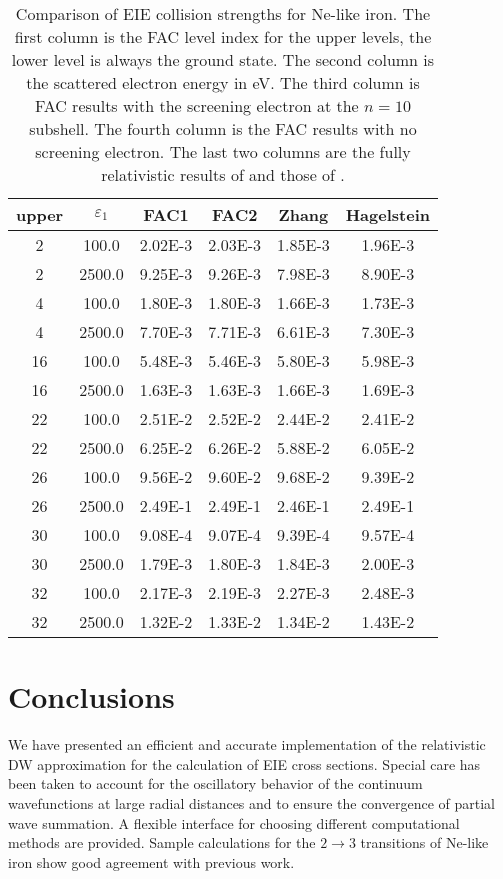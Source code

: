 \documentclass{elsart}
\begin{document}
\begin{table}
\caption{\label{tab_comparison}
Comparison of EIE collision strengths for Ne-like iron. The first column
is the FAC level index for the upper levels, the lower level is always the
ground state. The second column is the scattered electron energy in eV. The
third column is FAC results with the screening electron at the $n = 10$
subshell. The fourth column is the FAC results with no screening electron. The
last two columns are the fully relativistic results of
\citet{zhang89} and those of \citet{hagelstein87}.}
\begin{tabular}{cccccc}
\hline\hline
upper&$\varepsilon_1$&FAC1&FAC2&Zhang&Hagelstein\\
\hline
2&100.0&2.02E-3&2.03E-3&1.85E-3&1.96E-3\\
2&2500.0&9.25E-3&9.26E-3&7.98E-3&8.90E-3\\
4&100.0&1.80E-3&1.80E-3&1.66E-3&1.73E-3\\
4&2500.0&7.70E-3&7.71E-3&6.61E-3&7.30E-3\\
16&100.0&5.48E-3&5.46E-3&5.80E-3&5.98E-3\\
16&2500.0&1.63E-3&1.63E-3&1.66E-3&1.69E-3\\
22&100.0&2.51E-2&2.52E-2&2.44E-2&2.41E-2\\
22&2500.0&6.25E-2&6.26E-2&5.88E-2&6.05E-2\\
26&100.0&9.56E-2&9.60E-2&9.68E-2&9.39E-2\\
26&2500.0&2.49E-1&2.49E-1&2.46E-1&2.49E-1\\
30&100.0&9.08E-4&9.07E-4&9.39E-4&9.57E-4\\
30&2500.0&1.79E-3&1.80E-3&1.84E-3&2.00E-3\\
32&100.0&2.17E-3&2.19E-3&2.27E-3&2.48E-3\\
32&2500.0&1.32E-2&1.33E-2&1.34E-2&1.43E-2\\
\hline\hline
\end{tabular}
\end{table}

\section{Conclusions}
We have presented an efficient and accurate implementation of the relativistic
DW approximation for the calculation of EIE cross sections. Special care has
been taken to account for the oscillatory behavior of the continuum
wavefunctions at large radial distances and to ensure the convergence of
partial wave summation. A flexible interface for choosing
different computational methods are provided. Sample calculations for the
$2\to 3$ transitions of Ne-like iron show good agreement with previous work.
\end{document}
